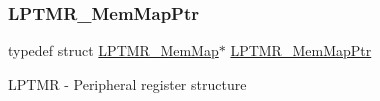 \subsubsection{\texorpdfstring{L\+P\+T\+M\+R\+\_\+\+Mem\+Map\+Ptr}{LPTMR\_MemMapPtr}}
{\footnotesize\ttfamily typedef struct \hyperlink{struct_l_p_t_m_r___mem_map}{L\+P\+T\+M\+R\+\_\+\+Mem\+Map}$\ast$ \hyperlink{group___l_p_t_m_r___peripheral_ga765226e2eeb35160c12820d4a2541320}{L\+P\+T\+M\+R\+\_\+\+Mem\+Map\+Ptr}}

L\+P\+T\+MR -\/ Peripheral register structure 